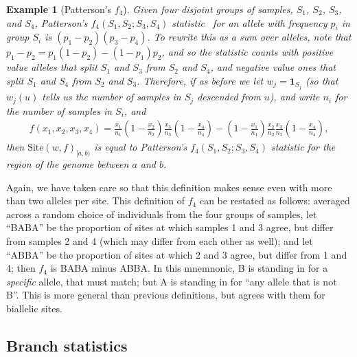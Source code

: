 \documentclass[9pt,twoside,lineno]{gsajnl}
\newcommand{\bone}{\mathbf{1}}
\newtheorem{example}{Example}
\newcommand{\site}{\mbox{Site}} %
\newcommand{\iw}{w} %
\begin{document}
\begin{example}[Patterson's $f_4$] \label{ex:site_f4}
    Given four disjoint groups of samples, $S_1$, $S_2$, $S_3$, and $S_4$,
    Patterson's $f_4(S_1, S_2; S_3, S_4)$
    statistic~\citep{reich2009reconstructing,patterson2012ancient}
    for an allele with frequency $p_i$ in group $S_i$
    is $(p_1 - p_2)(p_3 - p_4)$. To rewrite this as a sum over alleles, note that
    $p_1 - p_2 = p_1 (1 - p_2) - (1 - p_1) p_2$,
    and so the statistic counts with positive value
    alleles that split $S_1$ and $S_3$ from $S_2$ and $S_4$,
    and negative value ones that split $S_1$ and $S_4$ from $S_2$ and $S_3$.
    Therefore, if as before we
    let $\iw_j = \bone_{S_j}$
    (so that $\iw_{j}(u)$ tells us the number of samples in $S_j$ descended from $u$),
    and write $n_i$ for the number of samples in $S_i$, and
    \begin{align*}
        f(x_1, x_2, x_3, x_4)
        =
        \frac{x_1}{n_1}
        \left(1 - \frac{x_2}{n_2}\right)
        \frac{x_3}{n_3}
        \left(1 - \frac{x_4}{n_4}\right)
        -
        \left(1 - \frac{x_1}{n_1}\right)
        \frac{x_2}{n_2}
        \frac{x_3}{n_3}
        \left(1 - \frac{x_4}{n_4}\right),
    \end{align*}
    then $\site(\iw, f)_{[a,b)}$ is equal to Patterson's $f_4(S_1, S_2; S_3, S_4)$ statistic
    for the region of the genome between $a$ and $b$.
\end{example}

Again, we have taken care so that this definition
makes sense even with more than two alleles per site.
This definition of $f_4$ can be restated as follows:
averaged across a random choice of individuals from the four groups of samples,
let ``BABA'' be the proportion of sites at which samples 1 and 3 agree,
but differ from samples 2 and 4 (which may differ from each other as well);
and let ``ABBA'' be the proportion of sites at which 2 and 3 agree, but differ from 1 and 4;
then $f_4$ is BABA minus ABBA.
In this mnemnonic, B is standing in for a \emph{specific} allele, that must match;
but A is standing in for ``any allele that is not B''.
This is more general than previous definitions, but agrees with them for biallelic sites.


\subsection*{Branch statistics}
\end{document}

